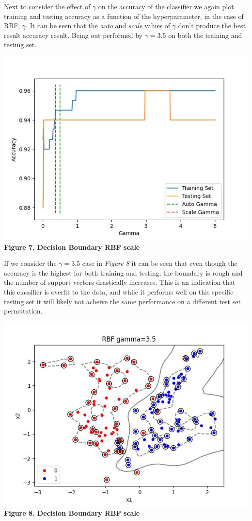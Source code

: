 \documentclass[11pt]{article}
\begin{document}
Next to consider the effect of \(\gamma\) on the accuracy of the
classifier we again plot training and testing accuracy as a function of
the hyperparameter, in the case of RBF, \(\gamma\). It can be seen that
the \emph{auto} and \emph{scale} values of \(\gamma\) don't produce the
best result accuracy result. Being out performed by \(\gamma = 3.5\) on
both the training and testing set.

\includegraphics{figures/3_1_rbf_acc_v_gamma.jpg}\\
\textbf{Figure 7. Decision Boundary RBF scale}

If we consider the \(\gamma = 3.5\) case in \emph{Figure 8} it can be
seen that even though the accuracy is the highest for both training and
testing, the boundary is rough and the number of support vectors
drastically increases. This is an indication that this classifier is
overfit to the data, and while it performs well on this specific testing
set it will likely not acheive the same performance on a different test
set permutation.

\includegraphics{figures/3_1_rbf_best.jpg}\\
\textbf{Figure 8. Decision Boundary RBF scale}
\end{document}
